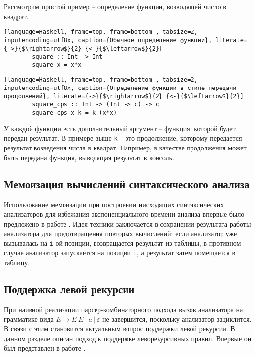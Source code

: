\documentclass[14pt]{matmex-diploma}
\begin{document}
    Рассмотрим простой пример -- определение функции, возводящей число в квадрат. 
    
        \begin{lstlisting}[language=Haskell, frame=top, frame=bottom , tabsize=2, inputencoding=utf8x, caption={Обычное определение функции}, literate={->}{$\rightarrow$}{2} {<-}{$\leftarrow$}{2}]
        square :: Int -> Int
        square x = x*x
        \end{lstlisting}

        \begin{lstlisting}[language=Haskell, frame=top, frame=bottom , tabsize=2, inputencoding=utf8x, caption={Определение функции в стиле передачи продолжений}, literate={->}{$\rightarrow$}{2} {<-}{$\leftarrow$}{2}]
        square_cps :: Int -> (Int -> c) -> c
        square_cps x k = k (x*x)
        \end{lstlisting}
        
    У каждой функции есть дополнительный аргумент -- функция, которой будет передан результат. В примере выше \lstinline[language=Haskell]{k} -- это продолжение, которому передается результат возведения числа в квадрат. Например, в качестве продолжения может быть передана функция, выводящая результат в консоль.
        
    \subsection{Мемоизация вычислений синтаксического анализа}
    Использование мемоизации при построении нисходящих синтаксических анализаторов для избежания экспоненциального времени анализа впервые было предложено в работе \cite{norvig1991techniques}. Идея техники заключается в сохранении результата работы анализатора для предотвращения повторых вычислений: если анализатор уже вызывалась на {\tt i}-ой позиции, возвращается результат из таблицы, в противном случае анализатор запускается на позиции {\tt i}, а результат затем помещается в таблицу. 
    
    \subsection{Поддержка левой рекурсии}

При наивной реализации парсер-комбинаторного подхода вызов анализатора на грамматике вида ${E \rightarrow E \ E \ | \ a \ | \ \varepsilon}$ не завершится, поскольку анализатор зациклится. В связи с этим становится актуальным вопрос поддержки левой рекурсии. В данном разделе описан подход к поддержке леворекурсивных правил. Впервые он был представлен в работе \cite{johnson1995memoization}. 
\end{document}
